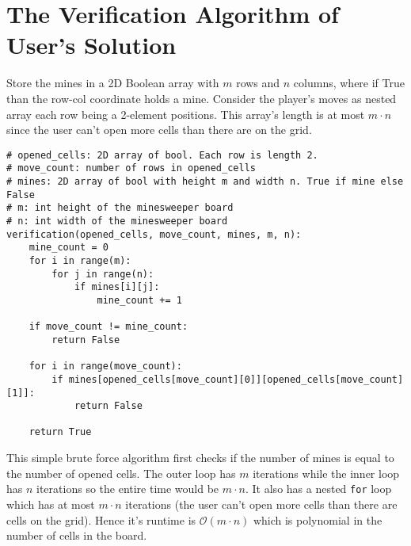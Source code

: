 \documentclass[11pt]{article}
\begin{document}
\section*{The Verification Algorithm of User's Solution}
\label{sec:orgd67a309}
Store the mines in a 2D Boolean array with \(m\) rows and \(n\) columns, where if True than the row-col coordinate holds a mine. Consider the player's moves as nested array each row being a 2-element positions. This array's length is at most \(m \cdot n\) since the user can't open more cells than there are on the grid.
\begin{verbatim}
# opened_cells: 2D array of bool. Each row is length 2.
# move_count: number of rows in opened_cells
# mines: 2D array of bool with height m and width n. True if mine else False
# m: int height of the minesweeper board
# n: int width of the minesweeper board
verification(opened_cells, move_count, mines, m, n):
    mine_count = 0
    for i in range(m):
        for j in range(n):
            if mines[i][j]:
                mine_count += 1

    if move_count != mine_count:
        return False

    for i in range(move_count):
        if mines[opened_cells[move_count][0]][opened_cells[move_count][1]]:
            return False

    return True
\end{verbatim}
This simple brute force algorithm first checks if the number of mines is equal to the number of opened cells. The outer loop has \(m\) iterations while the inner loop has \(n\) iterations so the entire time would be \(m \cdot n\). It also has a nested \texttt{for} loop which has at most \(m \cdot n\) iterations (the user can't open more cells than there are cells on the grid). Hence it's runtime is \(\mathcal{O}(m \cdot n)\) which is polynomial in the number of cells in the board.
\end{document}
